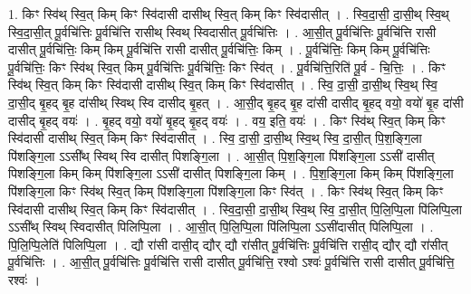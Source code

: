 \documentclass[17pt]{extarticle}
\begin{document}
1. किꣳ स्वि॑थ् स्वि॒त् किम् किꣳ स्वि॑दासी दासीथ् स्वि॒त् किम् किꣳ स्वि॑दासीत् । . स्वि॒दा॒सी॒ दा॒सी॒थ् स्वि॒थ् स्वि॒दा॒सी॒त् पू॒र्वचि॑त्तिः पू॒र्वचि॑त्ति रासीथ् स्विथ् स्विदासीत् पू॒र्वचि॑त्तिः । . आ॒सी॒त् पू॒र्वचि॑त्तिः पू॒र्वचि॑त्ति रासी दासीत् पू॒र्वचि॑त्तिः॒ किम् किम् पू॒र्वचि॑त्ति रासी दासीत् पू॒र्वचि॑त्तिः॒ किम् । . पू॒र्वचि॑त्तिः॒ किम् किम् पू॒र्वचि॑त्तिः पू॒र्वचि॑त्तिः॒ किꣳ स्वि॑थ् स्वि॒त् किम् पू॒र्वचि॑त्तिः पू॒र्वचि॑त्तिः॒ किꣳ स्वि॑त् । . पू॒र्वचि॑त्ति॒रिति॑ पू॒र्व - चि॒त्तिः॒ । . किꣳ स्वि॑थ् स्वि॒त् किम् किꣳ स्वि॑दासी दासीथ् स्वि॒त् किम् किꣳ स्वि॑दासीत् । . स्वि॒ दा॒सी॒ दा॒सी॒थ् स्वि॒थ् स्वि॒ दा॒सी॒द् बृ॒हद् बृ॒ह दा॑सीथ् स्विथ् स्वि दासीद् बृ॒हत् । . आ॒सी॒द् बृ॒हद् बृ॒ह दा॑सी दासीद् बृ॒हद् वयो॒ वयो॑ बृ॒ह दा॑सी दासीद् बृ॒हद् वयः॑ । . बृ॒हद् वयो॒ वयो॑ बृ॒हद् बृ॒हद् वयः॑ । . वय॒ इति॒ वयः॑ । . किꣳ स्वि॑थ् स्वि॒त् किम् किꣳ स्वि॑दासी दासीथ् स्वि॒त् किम् किꣳ स्वि॑दासीत् । . स्वि॒ दा॒सी॒ दा॒सी॒थ् स्वि॒थ् स्वि॒ दा॒सी॒त् पि॒श॒ङ्गि॒ला पि॑शङ्गि॒ला ऽऽसी᳚थ् स्विथ् स्वि दासीत् पिशङ्गि॒ला । . आ॒सी॒त् पि॒श॒ङ्गि॒ला पि॑शङ्गि॒ला ऽऽसी॑ दासीत् पिशङ्गि॒ला किम् किम् पि॑शङ्गि॒ला ऽऽसी॑ दासीत् पिशङ्गि॒ला किम् । . पि॒श॒ङ्गि॒ला किम् किम् पि॑शङ्गि॒ला पि॑शङ्गि॒ला किꣳ स्वि॑थ् स्वि॒त् किम् पि॑शङ्गि॒ला पि॑शङ्गि॒ला किꣳ स्वि॑त् । . किꣳ स्वि॑थ् स्वि॒त् किम् किꣳ स्वि॑दासी दासीथ् स्वि॒त् किम् किꣳ स्वि॑दासीत् । . स्वि॒दा॒सी॒ दा॒सी॒थ् स्वि॒थ् स्वि॒ दा॒सी॒त् पि॒लि॒प्पि॒ला पि॑लिप्पि॒ला ऽऽसी᳚थ् स्विथ् स्विदासीत् पिलिप्पि॒ला । . आ॒सी॒त् पि॒लि॒प्पि॒ला पि॑लिप्पि॒ला ऽऽसी॑दासीत् पिलिप्पि॒ला । . पि॒लि॒प्पि॒लेति॑ पिलिप्पि॒ला । . द्यौ रा॑सी दासी॒द् द्यौर् द्यौ रा॑सीत् पू॒र्वचि॑त्तिः पू॒र्वचि॑त्ति रासी॒द् द्यौर् द्यौ रा॑सीत् पू॒र्वचि॑त्तिः । . आ॒सी॒त् पू॒र्वचि॑त्तिः पू॒र्वचि॑त्ति रासी दासीत् पू॒र्वचि॑त्ति॒ रश्वो ऽश्वः॑ पू॒र्वचि॑त्ति रासी दासीत् पू॒र्वचि॑त्ति॒ रश्वः॑ । \newline
\end{document}
